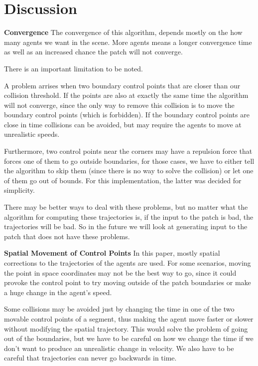 \section{Discussion}
\label{sec:discussion}

\textbf{Convergence}
The convergence of this algorithm, depends mostly on the how many agents we want in the scene. More agents means a longer convergence time as well as an increased chance the patch will not converge. 

There is an important limitation to be noted. 

A problem arrises when two boundary control points that are closer than our collision threshold. If the points are also at exactly the same time the algorithm will not converge, since the only way to remove this collision is to move the boundary control points (which is forbidden). If the boundary control points are close in time collisions can be avoided, but may require the agents to move at unrealistic speeds.

 Furthermore, two control points near the corners may have a repulsion force that forces one of them to go outside boundaries, for those cases, we have to either tell the algorithm to skip them (since there is no way to solve the collision) or let one of them go out of bounds. For this implementation, the latter was decided for simplicity.

There may be better ways to deal with these problems, but no matter what the algorithm for computing these trajectories is, if the input to the patch is bad, the trajectories will be bad. So in the future we will look at generating input to the patch that does not have these problems.

\textbf{ Spatial Movement of Control Points}
In this paper, mostly spatial corrections to the trajectories of the agents are used. For some scenarios, moving the point in space coordinates may not be the best way to go, since it could provoke the control point to try moving outside of the patch boundaries or make a huge change in the agent's speed.   

Some collisions may be avoided just by changing the time in one of the two movable control points of a segment, thus making the agent move faster or slower without modifying the spatial trajectory. This would solve the problem of going out of the boundaries, but we have to be careful on how we change the time if we don't want to produce an unrealistic change in velocity.  We also have to be careful that trajectories can never go backwards in time. 


